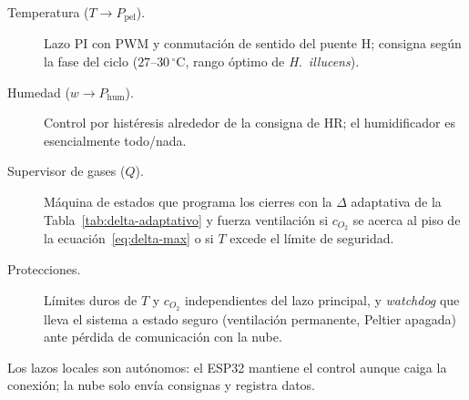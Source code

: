 \begin{description}
  \item[Temperatura ($T \to P_{\mathrm{pel}}$).] Lazo PI con PWM y
  conmutación de sentido del puente H; consigna según la fase del ciclo
  ($27$--$30\,^\circ$C, rango óptimo de \emph{H.~illucens}).
  \item[Humedad ($w \to P_{\mathrm{hum}}$).] Control por histéresis alrededor
  de la consigna de HR; el humidificador es esencialmente todo/nada.
  \item[Supervisor de gases ($Q$).] Máquina de estados que programa los
  cierres con la $\Delta$ adaptativa de la Tabla~\ref{tab:delta-adaptativo} y
  fuerza ventilación si $c_{O_2}$ se acerca al piso de la
  ecuación~\eqref{eq:delta-max} o si $T$ excede el límite de seguridad.
  \item[Protecciones.] Límites duros de $T$ y $c_{O_2}$ independientes del
  lazo principal, y \emph{watchdog} que lleva el sistema a estado seguro
  (ventilación permanente, Peltier apagada) ante pérdida de comunicación con
  la nube.
\end{description}

Los lazos locales son autónomos: el ESP32 mantiene el control aunque caiga la
conexión; la nube solo envía consignas y registra datos.